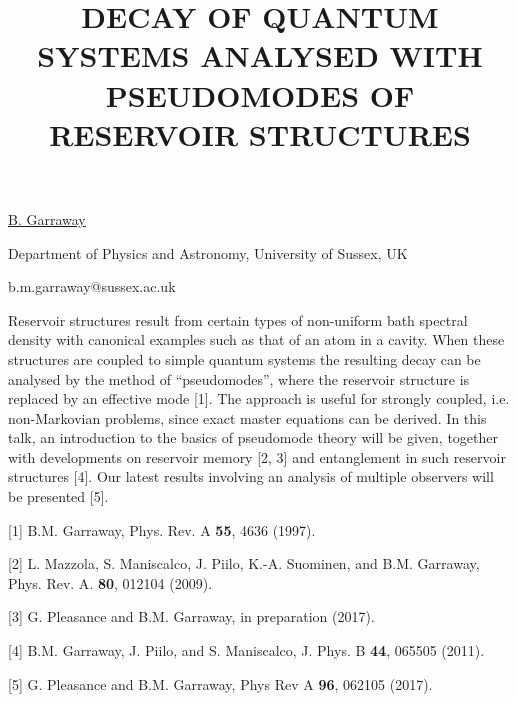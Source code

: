 \title{DECAY OF QUANTUM SYSTEMS ANALYSED WITH PSEUDOMODES OF RESERVOIR STRUCTURES}

\underline{B. Garraway} 

{\normalsize{\vspace{-4mm}
Department of Physics and Astronomy,
University of Sussex,
UK



\email b.m.garraway@sussex.ac.uk}}

Reservoir structures result from certain types of non-uniform bath
spectral density with canonical examples such as that of an atom in a
cavity. When these structures are coupled to simple quantum systems
the resulting decay can be analysed by the method of ``pseudomodes'',
where the reservoir structure is replaced by an effective
mode [1]. The approach is useful for strongly coupled,
i.e. non-Markovian problems, since exact master equations can be
derived. In this talk, an introduction to the basics of pseudomode
theory will be given, together with developments on reservoir memory
[2, 3] and entanglement in such reservoir structures [4]. Our latest
results involving an analysis of multiple observers will be
presented [5].

{\normalsize
[1] B.M. Garraway, Phys. Rev. A \textbf{55}, 4636 (1997).
\vsp

[2] L. Mazzola, S. Maniscalco, J. Piilo, K.-A. Suominen, and
    B.M. Garraway, Phys. Rev. A. \textbf{80}, 012104 (2009).
\vsp

[3] G. Pleasance and B.M. Garraway, in preparation (2017).
\vsp

[4] B.M. Garraway, J. Piilo, and S. Maniscalco, J. Phys. B \textbf{44}, 065505
    (2011).
\vsp

[5] G. Pleasance and B.M. Garraway, Phys Rev A \textbf{96}, 062105 (2017).
}

\vspace{\baselineskip}
